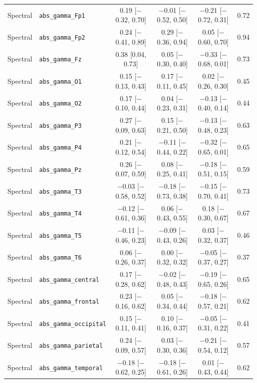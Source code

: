 {\begin{longtable}{llcccc}
Spectral & \texttt{abs\_gamma\_Fp1} & 0.19 [$-$0.32, 0.70] & $-$0.01 [$-$0.52, 0.50] & $-$0.21 [$-$0.72, 0.31] & 0.72 \\
Spectral & \texttt{abs\_gamma\_Fp2} & 0.24 [$-$0.41, 0.89] & 0.29 [$-$0.36, 0.94] & 0.05 [$-$0.60, 0.70] & 0.94 \\
Spectral & \texttt{abs\_gamma\_Fz} & 0.38 [0.04, 0.73] & 0.05 [$-$0.30, 0.40] & $-$0.33 [$-$0.68, 0.01] & 0.73 \\
Spectral & \texttt{abs\_gamma\_O1} & 0.15 [$-$0.13, 0.43] & 0.17 [$-$0.11, 0.45] & 0.02 [$-$0.26, 0.30] & 0.45 \\
Spectral & \texttt{abs\_gamma\_O2} & 0.17 [$-$0.10, 0.44] & 0.04 [$-$0.23, 0.31] & $-$0.13 [$-$0.40, 0.14] & 0.44 \\
Spectral & \texttt{abs\_gamma\_P3} & 0.27 [$-$0.09, 0.63] & 0.15 [$-$0.21, 0.50] & $-$0.13 [$-$0.48, 0.23] & 0.63 \\
Spectral & \texttt{abs\_gamma\_P4} & 0.21 [$-$0.12, 0.54] & $-$0.11 [$-$0.44, 0.22] & $-$0.32 [$-$0.65, 0.01] & 0.65 \\
Spectral & \texttt{abs\_gamma\_Pz} & 0.26 [$-$0.07, 0.59] & 0.08 [$-$0.25, 0.41] & $-$0.18 [$-$0.51, 0.15] & 0.59 \\
Spectral & \texttt{abs\_gamma\_T3} & $-$0.03 [$-$0.58, 0.52] & $-$0.18 [$-$0.73, 0.38] & $-$0.15 [$-$0.70, 0.41] & 0.73 \\
Spectral & \texttt{abs\_gamma\_T4} & $-$0.12 [$-$0.61, 0.36] & 0.06 [$-$0.43, 0.55] & 0.18 [$-$0.30, 0.67] & 0.67 \\
Spectral & \texttt{abs\_gamma\_T5} & $-$0.11 [$-$0.46, 0.23] & $-$0.09 [$-$0.43, 0.26] & 0.03 [$-$0.32, 0.37] & 0.46 \\
Spectral & \texttt{abs\_gamma\_T6} & 0.06 [$-$0.26, 0.37] & 0.00 [$-$0.32, 0.32] & $-$0.05 [$-$0.37, 0.27] & 0.37 \\
Spectral & \texttt{abs\_gamma\_central} & 0.17 [$-$0.28, 0.62] & $-$0.02 [$-$0.48, 0.43] & $-$0.19 [$-$0.65, 0.26] & 0.65 \\
Spectral & \texttt{abs\_gamma\_frontal} & 0.23 [$-$0.16, 0.62] & 0.05 [$-$0.34, 0.44] & $-$0.18 [$-$0.57, 0.21] & 0.62 \\
Spectral & \texttt{abs\_gamma\_occipital} & 0.15 [$-$0.11, 0.41] & 0.10 [$-$0.16, 0.37] & $-$0.05 [$-$0.31, 0.22] & 0.41 \\
Spectral & \texttt{abs\_gamma\_parietal} & 0.24 [$-$0.09, 0.57] & 0.03 [$-$0.30, 0.36] & $-$0.21 [$-$0.54, 0.12] & 0.57 \\
Spectral & \texttt{abs\_gamma\_temporal} & $-$0.18 [$-$0.62, 0.25] & $-$0.18 [$-$0.61, 0.26] & 0.01 [$-$0.43, 0.44] & 0.62 \\

\end{longtable}}
